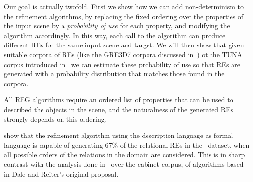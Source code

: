 Our goal is actually twofold. First we show how we can add non-determinism to the refinement algorithms, by replacing the fixed ordering 
over the properties of the input scene by a \emph{probability of use} for each property, and modifying the algorithm accordingly.  
In this way, each call to the algorithm can produce different REs for the same input scene and target.  We will then show that given suitable corpora of REs (like the GRE3D7 corpora discussed in~\cite{viet:gene11}) ot the TUNA corpus introduced in~\cite{gatt-balz-kow:2008:ENLG} we can estimate these probability of use so that REs are generated with a probability distribution that matches those found in the corpora.  

All REG algorithms require an 
ordered list of properties that can be used to described the objects in the scene, and the naturalness of the generated REs strongly depends on this ordering. 

show that the refinement algorithm using the description language \el as formal language is capable of generating 67\% of 
the relational REs in the~\cite{viethen06:_algor_for_gener_refer_expres} dataset, when all possible orders of the relations in the domain are considered. This is in sharp contrast with the analysis 
done in~\cite{viethen06:_algor_for_gener_refer_expres} over the cabinet corpus, of algorithms based in Dale and Reiter's original proposal.    

